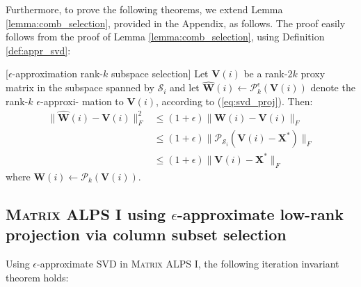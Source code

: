 \documentclass[twocolumn]{svjour3}
\newcommand{\vectornormbig}[1]{\big\|#1\big\|}
\newcommand{\bestsignal}{\boldsymbol{X}^\ast}
\newcommand{\rank}{k}
\begin{document}
Furthermore, to prove the following theorems, we extend Lemma \ref{lemma:comb_selection}, provided in the Appendix, as follows. The proof easily follows from the proof of Lemma \ref{lemma:comb_selection}, using Definition \ref{def:appr_svd}:
\begin{lemma}{\label{lemma:appr_comb_selection}}[$ \epsilon $-approximation rank-$ \rank $ subspace selection] Let $ \boldsymbol{V}(i) $ be a rank-$ 2\rank $ proxy matrix in the subspace spanned by $ \mathcal{S}_i $ and let $ \widehat{\boldsymbol{W}}(i) \leftarrow \mathcal{P}_{\rank}^{\epsilon}(\boldsymbol{V}(i)) $ denote the rank-$ \rank $ $ \epsilon $-approxi- mation to $ \boldsymbol{V}(i) $, according to (\ref{eq:svd_proj}). Then:
\begin{align}
\vectornormbig{\widehat{\boldsymbol{W}}(i)  - \boldsymbol{V}(i)}_F^2 &\leq (1 + \epsilon) \vectornormbig{\boldsymbol{W}(i)  - \boldsymbol{V}(i)}_F \nonumber \\ &\leq (1+\epsilon) \vectornormbig{\mathcal{P}_{\mathcal{S}_i}(\boldsymbol{V}(i) - \bestsignal)}_F \nonumber \\ &\leq (1+\epsilon)\vectornormbig{\boldsymbol{V}(i) - \bestsignal}_F \label{eq:mALPS5:13_appr}
\end{align} where $ \boldsymbol{W}(i) \leftarrow \mathcal{P}_{\rank}(\boldsymbol{V}(i)) $.
\end{lemma}

\subsection{\textsc{Matrix ALPS I} using $ \epsilon $-approximate low-rank projection via column subset selection}

Using $ \epsilon $-approximate SVD in \textsc{Matrix ALPS I}, the following iteration invariant theorem holds:
\end{document}
